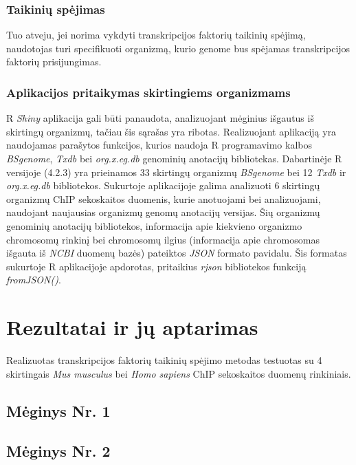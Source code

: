 \documentclass[12pt]{article}
\begin{document}
\subsubsection*{Taikinių spėjimas}
Tuo atveju, jei norima vykdyti transkripcijos faktorių taikinių spėjimą,
naudotojas turi specifikuoti organizmą, kurio genome bus spėjamas transkripcijos
faktorių prisijungimas.

\subsubsection*{Aplikacijos pritaikymas skirtingiems organizmams}
R \emph{Shiny} aplikacija gali būti panaudota, analizuojant mėginius išgautus
iš skirtingų organizmų, tačiau šis sąrašas yra ribotas. Realizuojant aplikaciją
yra naudojamas parašytos funkcijos, kurios naudoja R programavimo kalbos
\emph{BSgenome}, \emph{Txdb} bei \emph{org.x.eg.db} genominių anotacijų
bibliotekas. Dabartinėje R versijoje (4.2.3) yra prieinamos 33 skirtingų
organizmų \emph{BSgenome} bei 12 \emph{Txdb} ir \emph{org.x.eg.db} bibliotekos.
Sukurtoje aplikacijoje galima analizuoti 6 skirtingų organizmų ChIP sekoskaitos
duomenis, kurie anotuojami bei analizuojami, naudojant naujausias organizmų
genomų anotacijų versijas. Šių organizmų genominių anotacijų bibliotekos,
informacija apie kiekvieno organizmo chromosomų rinkinį bei chromosomų ilgius
(informacija apie chromosomas išgauta iš \emph{NCBI}\cite{NCBI} duomenų bazės)
pateiktos \emph{JSON}\cite{JSON} formato pavidalu. Šis formatas sukurtoje
R aplikacijoje apdorotas, pritaikius \emph{rjson}\cite{RJSON} bibliotekos
funkciją \emph{fromJSON()}.

\newpage


\section{Rezultatai ir jų aptarimas}
Realizuotas transkripcijos faktorių taikinių spėjimo metodas testuotas su 4
skirtingais \emph{Mus musculus} bei \emph{Homo sapiens} ChIP sekoskaitos
duomenų rinkiniais.

\subsection{Mėginys Nr. 1}
\subsection{Mėginys Nr. 2}
\end{document}
